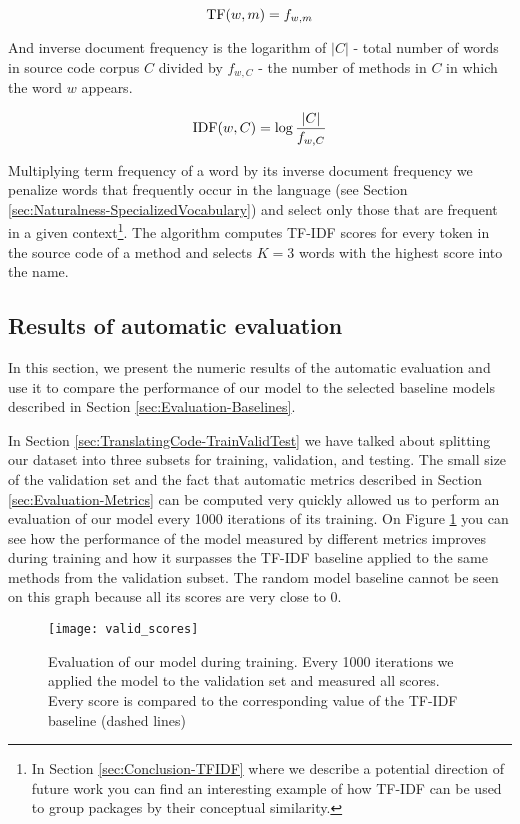 \[ \text{TF}(w, m) = f_{w,m} \]

And inverse document frequency is the logarithm of $|C|$ - total number of words in source code corpus $C$ divided by $f_{w,C}$ - the number of methods in $C$ in which the word $w$ appears.

\[ \text{IDF}(w, C) = \log \frac{|C|}{f_{w,C}} \]

Multiplying term frequency of a word by its inverse document frequency we penalize words that frequently occur in the language (see Section \ref{sec:Naturalness-SpecializedVocabulary}) and select only those that are frequent in a given context\footnote{In Section \ref{sec:Conclusion-TFIDF} where we describe a potential direction of future work you can find an interesting example of how TF-IDF can be used to group packages by their conceptual similarity.}. The algorithm computes TF-IDF scores for every token in the source code of a method and selects $K=3$ words with the highest score into the name.


\subsection{Results of automatic evaluation}

In this section, we present the numeric results of the automatic evaluation and use it to compare the performance of our model to the selected baseline models described in Section \ref{sec:Evaluation-Baselines}.

In Section \ref{sec:TranslatingCode-TrainValidTest} we have talked about splitting our dataset into three subsets for training, validation, and testing. The small size of the validation set and the fact that automatic metrics described in Section \ref{sec:Evaluation-Metrics} can be computed very quickly allowed us to perform an evaluation of our model every 1000 iterations of its training. On Figure \ref{fig:ValidScores} you can see how the performance of the model measured by different metrics improves during training and how it surpasses the TF-IDF baseline applied to the same methods from the validation subset. The random model baseline cannot be seen on this graph because all its scores are very close to 0.

\begin{figure}[H]
    \centering
    \texttt{[image: valid\_scores]}
  \caption{Evaluation of our model during training. Every 1000 iterations we applied the model to the validation set and measured all scores. Every score is compared to the corresponding value of the TF-IDF baseline (dashed lines)}
  \label{fig:ValidScores}
\end{figure}

